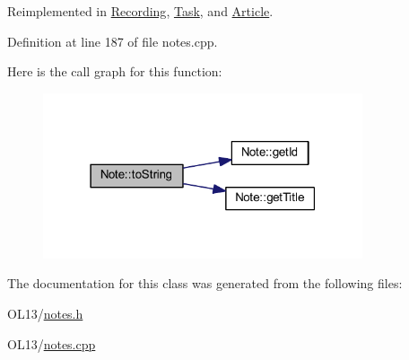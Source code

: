 Reimplemented in \hyperlink{class_recording_a9f403a39bec2db40c9171a6c3a20942d}{Recording}, \hyperlink{class_task_a7fe5cb7b57a21693e7abfea2f9618563}{Task}, and \hyperlink{class_article_ae40d268ecffbaaa549968a81ea609ba4}{Article}.



Definition at line 187 of file notes.\+cpp.

Here is the call graph for this function\+:\nopagebreak
\begin{figure}[H]
\begin{center}
\leavevmode
\includegraphics[width=267pt]{class_note_a1bd4acfbde0b71d05fd7d4ca889bca2b_cgraph}
\end{center}
\end{figure}


The documentation for this class was generated from the following files\+:\begin{DoxyCompactItemize}
\item 
O\+L13/\hyperlink{notes_8h}{notes.\+h}\item 
O\+L13/\hyperlink{notes_8cpp}{notes.\+cpp}\end{DoxyCompactItemize}

